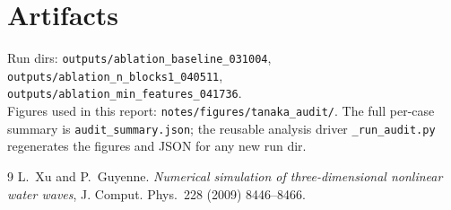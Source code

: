 \documentclass[11pt,letterpaper]{article}
\begin{document}
\section*{Artifacts}

Run dirs:
\texttt{outputs/ablation\_baseline\_031004},
\texttt{outputs/ablation\_n\_blocks1\_040511},
\texttt{outputs/ablation\_min\_features\_041736}.\\
Figures used in this report: \texttt{notes/figures/tanaka\_audit/}. The full per-case
summary is \texttt{audit\_summary.json}; the reusable analysis driver
\texttt{\_run\_audit.py} regenerates the figures and JSON for any new run dir.

\begin{thebibliography}{9}
 L.~Xu and P.~Guyenne. \emph{Numerical simulation of three-dimensional
nonlinear water waves}, J. Comput. Phys.\ 228 (2009) 8446--8466.
\end{thebibliography}
\end{document}
